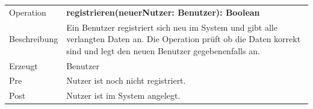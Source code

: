 \documentclass[12pt,a4paper]{article}
\begin{document}
\begin{tabular}{|lp{12cm}|}
			\hline
			Operation &  \textbf{registrieren(neuerNutzer: Benutzer): Boolean }\\ 
			Beschreibung & Ein Benutzer registriert sich neu im System und gibt alle verlangten Daten an. Die Operation prüft ob die Daten korrekt sind und legt den neuen Benutzer gegebenenfalls an.\\ 
			Erzeugt &  Benutzer\\ 
			Pre &  Nutzer ist noch nicht registriert. \\ 
			Post & Nutzer ist im System angelegt.  \\ 
			\hline 
\end{tabular} \\\\
\end{document}
